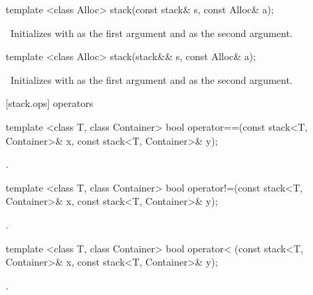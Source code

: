 \begin{itemdecl}
template <class Alloc>
  stack(const stack& s, const Alloc& a);
\end{itemdecl}

\begin{itemdescr}
\pnum
\effects\ Initializes  with  as the first argument and 
as the second argument.
\end{itemdescr}

\begin{itemdecl}
template <class Alloc>
  stack(stack&& s, const Alloc& a);
\end{itemdecl}

\begin{itemdescr}
\pnum
\effects\ Initializes  with  as the first argument and 
as the second argument.
\end{itemdescr}

[stack.ops]{ operators}

%
\begin{itemdecl}
template <class T, class Container>
    bool operator==(const stack<T, Container>& x,
                    const stack<T, Container>& y);
\end{itemdecl}

\begin{itemdescr}
\pnum
\returns
{}.
\end{itemdescr}

%
\begin{itemdecl}
template <class T, class Container>
    bool operator!=(const stack<T, Container>& x,
                    const stack<T, Container>& y);
\end{itemdecl}

\begin{itemdescr}
\pnum
\returns
{}.
\end{itemdescr}

%
\begin{itemdecl}
template <class T, class Container>
    bool operator< (const stack<T, Container>& x,
                    const stack<T, Container>& y);
\end{itemdecl}

\begin{itemdescr}
\pnum
\returns
{}.
\end{itemdescr}

